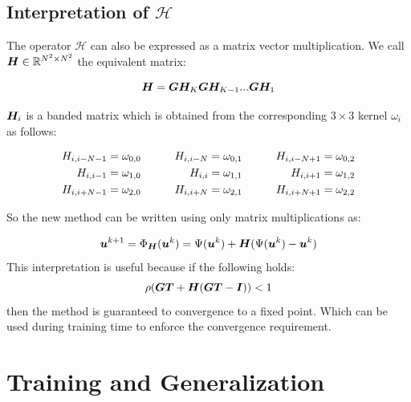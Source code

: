 \subsection{Interpretation of $\mathcal{H}$ }
The operator $\mathcal{H}$ can also be expressed as a matrix vector multiplication. We call ${\bm{H}} \in {\mathbb{R}}^{N^2 \times N^2}$ the equivalent matrix:

\begin{equation*}
    {\bm{H}} = {\bm{G}}{\bm{H}}_K{\bm{G}}{\bm{H}}_{K-1}...{\bm{G}}{\bm{H}}_1
\end{equation*}

${\bm{H}}_i$ is a banded matrix which is obtained from the corresponding $3\times3$ kernel $\omega_i$ as follows:

\begin{alignat*}{3}
{H}_{i,i-N-1}  & = \omega_{0,0}  &\qquad {H}_{i,i-N} &  = \omega_{0,1}  &\qquad {H}_{i,i-N+1}  & = \omega_{0,2}\\
{H}_{i,i-1}  & = \omega_{1,0}  &  {H}_{i,i} & = \omega_{1,1} &  {H}_{i,i+1}  & = \omega_{1,2}\\
{H}_{i,i+N-1}  & = \omega_{2,0}  &  {H}_{i,i+N}  & = \omega_{2,1}  &  {H}_{i,i+N+1}  & = \omega_{2,2}
\end{alignat*}

So the new method can be written using only matrix multiplications as:

\begin{align*}
{\bm{u}}^{k+1} &= \Phi_{{\bm{H}}}({\bm{u}}^k) = \Psi({\bm{u}}^k) + {\bm{H}}(\Psi({\bm{u}}^k)-{\bm{u}}^k)\\
\label{jacobiMatrix}
\end{align*}
This interpretation is useful because if the following holds:
\begin{equation}
    \rho({\bm{G}}{\bm{T}}+{\bm{H}}({\bm{G}}{\bm{T}}-{\bm{I}})) < 1
    \label{Eq:spectral}
\end{equation}
then the method is guaranteed to convergence to a fixed point. Which can be used during training time to enforce the convergence requirement.

\section{Training and Generalization}

